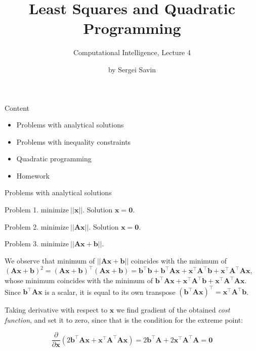 \documentclass{beamer}
\title{Least Squares and Quadratic Programming}
\subtitle{Computational Intelligence, Lecture 4}
\author{by Sergei Savin}
\date{\mydate}
\begin{document}
\maketitle


\begin{frame}{Content}

\begin{itemize}
\item Problems with analytical solutions
\item Problems with inequality constraints
\item Quadratic programming
\item Homework
\end{itemize}

\end{frame}



\begin{frame}{Problems with analytical solutions}
\begin{flushleft}

Problem 1. $\text{minimize} \ ||\mathbf{x}||$. Solution $\mathbf{x} = \mathbf{0}$.

\bigskip

Problem 2. $\text{minimize} \ ||\mathbf{A}\mathbf{x}||$. Solution $\mathbf{x} = \mathbf{0}$.

\bigskip

Problem 3. $\text{minimize} \ ||\mathbf{A}\mathbf{x} + \mathbf{b}||$. 

\bigskip

We observe that minimum of $||\mathbf{A}\mathbf{x} + \mathbf{b}||$ coincides with the minimum of $(\mathbf{A}\mathbf{x} + \mathbf{b})^2 = (\mathbf{A}\mathbf{x} + \mathbf{b})^\top (\mathbf{A}\mathbf{x} + \mathbf{b}) = \mathbf{b}^\top\mathbf{b} + \mathbf{b}^\top\mathbf{A}\mathbf{x} + \mathbf{x}^\top\mathbf{A}^\top\mathbf{b} + \mathbf{x}^\top\mathbf{A}^\top\mathbf{A}\mathbf{x}$, whose minimum coincides with the minimum of $\mathbf{b}^\top\mathbf{A}\mathbf{x} + \mathbf{x}^\top\mathbf{A}^\top\mathbf{b} + \mathbf{x}^\top\mathbf{A}^\top\mathbf{A}\mathbf{x}$. Since $\mathbf{b}^\top\mathbf{A}\mathbf{x}$ is a scalar, it is equal to its own transpose $(\mathbf{b}^\top\mathbf{A}\mathbf{x})^\top = \mathbf{x}^\top\mathbf{A}^\top\mathbf{b}$.

Taking derivative with respect to $\mathbf{x}$ we find gradient of the obtained \emph{cost function}, and set it to zero, since that is the condition for the extreme point:

\begin{equation}
    \frac{\partial}{\partial \mathbf{x}} (2\mathbf{b}^\top\mathbf{A}\mathbf{x} + \mathbf{x}^\top\mathbf{A}^\top\mathbf{A}\mathbf{x}) = 2\mathbf{b}^\top\mathbf{A} + 2\mathbf{x}^\top\mathbf{A}^\top\mathbf{A} = \mathbf{0}
\end{equation}
 
\end{flushleft}
\end{frame}
\end{document}
